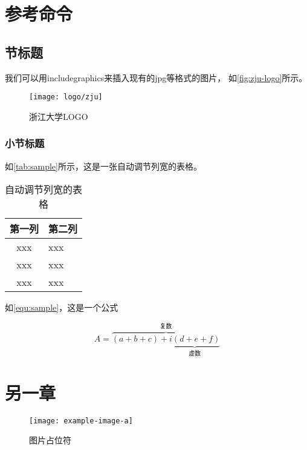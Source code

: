 \chapter{参考命令}
\section{节标题}

我们可以用includegraphics来插入现有的jpg等格式的图片，
如\autoref{fig:zju-logo}所示。

\begin{figure}[htbp]
    \centering
    \texttt{[image: logo/zju]}
    \caption{\label{fig:zju-logo}浙江大学LOGO}
\end{figure}


\subsection{小节标题}


\par 如\autoref{tab:sample}所示，这是一张自动调节列宽的表格。

\begin{table}[htbp]
    \caption{\label{tab:sample}自动调节列宽的表格}
    \begin{tabularx}{\linewidth}{c|X<{\centering}}
        \hline
        第一列 & 第二列 \\ \hline
        xxx & xxx \\ \hline
        xxx & xxx \\ \hline
        xxx & xxx \\ \hline
    \end{tabularx}
\end{table}


\par 如\autoref{equ:sample}，这是一个公式

\begin{equation}
    \label{equ:sample}
    A=\overbrace{(a+b+c)+\underbrace{i(d+e+f)}_{\text{虚数}}}^{\text{复数}}
\end{equation}

\chapter{另一章}


\begin{figure}[htbp]
    \centering
    \texttt{[image: example-image-a]}
    \caption{\label{fig:fig-placeholder}图片占位符}
\end{figure}